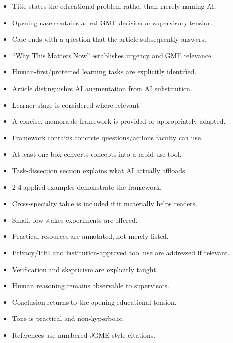 \documentclass[12pt]{article}
\begin{document}
\begin{itemize}[label=$\square$]
	\item Title states the educational problem rather than merely naming AI.
	\item Opening case contains a real GME decision or supervisory tension.
	\item Case ends with a question that the article subsequently answers.
	\item ``Why This Matters Now'' establishes urgency and GME relevance.
	\item Human-first/protected learning tasks are explicitly identified.
	\item Article distinguishes AI augmentation from AI substitution.
	\item Learner stage is considered where relevant.
	\item A concise, memorable framework is provided or appropriately adapted.
	\item Framework contains concrete questions/actions faculty can use.
	\item At least one box converts concepts into a rapid-use tool.
	\item Task-dissection section explains what AI actually offloads.
	\item 2-4 applied examples demonstrate the framework.
	\item Cross-specialty table is included if it materially helps readers.
	\item Small, low-stakes experiments are offered.
	\item Practical resources are annotated, not merely listed.
	\item Privacy/PHI and institution-approved tool use are addressed if relevant.
	\item Verification and skepticism are explicitly taught.
	\item Human reasoning remains observable to supervisors.
	\item Conclusion returns to the opening educational tension.
	\item Tone is practical and non-hyperbolic.
	\item References use numbered JGME-style citations.
\end{itemize}
\end{document}
